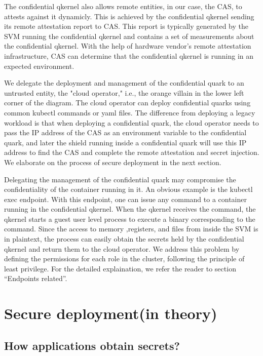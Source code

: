 The confidential qkernel also allows remote entities, in our case, the CAS, to attests against it dynamicly. This is achieved by the confidential qkernel sending its remote attestation report to CAS. 
This report is typically generated by the SVM running the confidential qkernel and contains a set of measurements about the confidential qkernel. With the help of hardware vendor's remote attestation infrastructure, CAS can determine that the 
confidential qkernel is running in an expected environment.

We delegate the deployment and management of the confidential quark to an untrusted entity, the "cloud operator," i.e., the orange villain in the lower left corner of the diagram. The cloud operator can deploy confidential quarks using 
common kubectl commands or yaml files. The difference from deploying a legacy workload is that when deploying a confidential quark, the cloud operator needs to pass 
the IP address of the CAS as an environment variable to the confidential quark, and later the shield running inside a confidential quark will use this IP address to find the CAS and complete the remote attestation and secret injection. We elaborate on the process of secure deployment in the next section.

Delegating the management of the confidential quark may compromise the confidentiality of the container running in it.  An obvious example is the kubectl exec endpoint. With this endpoint, one can issue any command to a container running in the confidential qkernel. 
When the qkernel receives the command, the qkernel starts a guest user level process to execute a binary corresponding to the command. Since the access to memory ,registers, and files from inside the SVM is in plaintext, the process can easily obtain 
the secrets held by the confidential qkernel and return them to the cloud operator. We address this problem by defining the permissions for each role in the cluster, following the principle of least privilege. 
For the detailed explaination, we refer the reader to section “Endpoints related”.


\section{Secure deployment(in theory)}
\label{Secure_deployment}

\subsection{How applications obtain secrets?}

